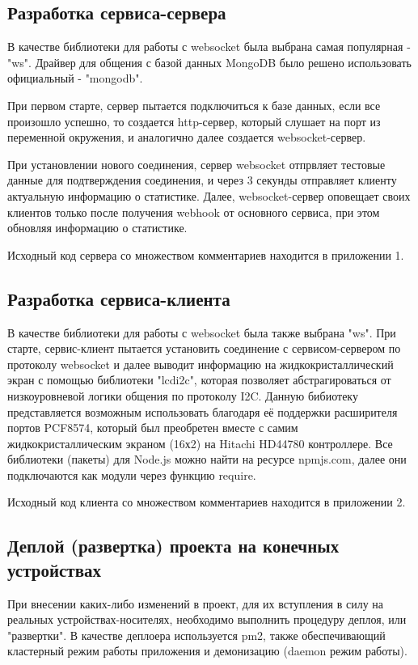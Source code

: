 \documentclass[a4paper, 12pt]{article}
\begin{document}
    \subsection*{Разработка сервиса-сервера}
    В качестве библиотеки для работы с websocket была выбрана самая популярная - "ws". Драйвер для общения с базой
    данных MongoDB было решено использовать официальный - "mongodb".

    При первом старте, сервер пытается подключиться к базе данных, если все произошло успешно, то создается http-сервер,
    который слушает на порт из переменной окружения, и аналогично далее создается websocket-сервер.

    При установлении нового соединения, сервер websocket отпрвляет тестовые данные для подтверждения соединения,
    и через 3 секунды отправляет клиенту актуальную информацию о статистике. Далее, websocket-сервер оповещает
    своих клиентов только после получения webhook от основного сервиса, при этом обновляя информацию о статистике.

    Исходный код сервера со множеством комментариев находится в приложении 1.

    \subsection*{Разработка сервиса-клиента}
    В качестве библиотеки для работы с websocket была также выбрана "ws". При старте, сервис-клиент пытается установить
    соединение с сервисом-сервером по протоколу websocket и далее выводит информацию на жидкокристаллический экран с помощью библиотеки
    "lcdi2c", которая позволяет абстрагироваться от низкоуровневой логики общения по протоколу I2C.
    Данную бибиотеку представляется возможным использовать благодаря её поддержки расширителя портов PCF8574, который был
    преобретен вместе с самим жидкокристаллическим экраном (16х2) на Hitachi HD44780 контроллере.
    Все библиотеки (пакеты) для Node.js можно найти на ресурсе npmjs.com, далее они подключаются как модули через функцию require.

    Исходный код клиента со множеством комментариев находится в приложении 2.

    \subsection*{Деплой (развертка) проекта на конечных устройствах}
    При внесении каких-либо изменений в проект, для их вступления в силу на реальных устройствах-носителях, необходимо
    выполнить процедуру деплоя, или "развертки". В качестве деплоера используется pm2, также обеспечивающий кластерный режим
    работы приложения и демонизацию (daemon режим работы).
\end{document}
